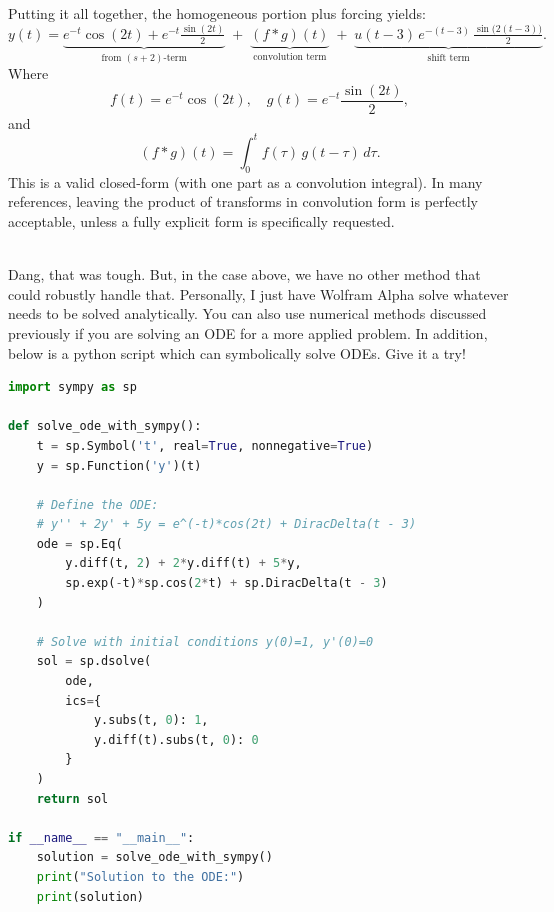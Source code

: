 \begin{example}
\begin{solution}
\begin{enumerate}
   Putting it all together, the homogeneous portion plus forcing yields:
   \[
   y(t) 
   = \underbrace{
       e^{-t}\cos(2t)
       + e^{-t}\tfrac{\sin(2t)}{2}
     }_{\text{from }(s+2)\text{-term}}
     \;+\;
     \underbrace{
       (f*g)(t)
     }_{\text{convolution term}}
     \;+\;
     \underbrace{
       u(t-3)\,
       e^{-(t-3)}\,
       \tfrac{\sin\bigl(2(t-3)\bigr)}{2}
     }_{\text{shift term}}.
   \]
   Where
   \[
   f(t) = e^{-t}\cos(2t), 
   \quad
   g(t) = e^{-t}\frac{\sin(2t)}{2},
   \]
   and
   \[
   (f*g)(t)
   = \int_0^t f(\tau)\,g(t-\tau)\,d\tau.
   \]
   This is a valid closed-form (with one part as a convolution integral). In many references, leaving the product of transforms in convolution form is perfectly acceptable, unless a fully explicit form is specifically requested. 


\end{enumerate}
\end{solution}
\end{example}
\exampleline
\\

\noindent Dang, that was tough. But, in the case above, we have no other method that could robustly handle that. Personally, I just have Wolfram Alpha solve whatever needs to be solved analytically. You can also use numerical methods discussed previously if you are solving an ODE for a more applied problem. In addition, below is a python script which can symbolically solve ODEs. Give it a try!

\vspace{1.3em} 


\begin{lstlisting}[language=Python]
import sympy as sp

def solve_ode_with_sympy():
    t = sp.Symbol('t', real=True, nonnegative=True)
    y = sp.Function('y')(t)
    
    # Define the ODE:
    # y'' + 2y' + 5y = e^(-t)*cos(2t) + DiracDelta(t - 3)
    ode = sp.Eq(
        y.diff(t, 2) + 2*y.diff(t) + 5*y,
        sp.exp(-t)*sp.cos(2*t) + sp.DiracDelta(t - 3)
    )
    
    # Solve with initial conditions y(0)=1, y'(0)=0
    sol = sp.dsolve(
        ode,
        ics={
            y.subs(t, 0): 1,
            y.diff(t).subs(t, 0): 0
        }
    )
    return sol

if __name__ == "__main__":
    solution = solve_ode_with_sympy()
    print("Solution to the ODE:")
    print(solution)

\end{lstlisting}

